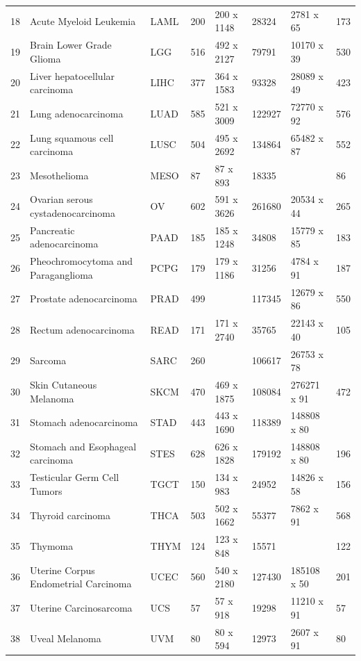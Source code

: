 \begin{widetable}[h]
\begin{tabular}{rlllllll}
  18 & Acute Myeloid Leukemia & LAML & 200 & 200 x 1148 & 28324 & 2781 x 65 & 173 \\ 
  19 & Brain Lower Grade Glioma & LGG & 516 & 492 x 2127 & 79791 & 10170 x 39 & 530 \\ 
  20 & Liver hepatocellular carcinoma & LIHC & 377 & 364 x 1583 & 93328 & 28089 x 49 & 423 \\ 
  21 & Lung adenocarcinoma & LUAD & 585 & 521 x 3009 & 122927 & 72770 x 92 & 576 \\ 
  22 & Lung squamous cell carcinoma & LUSC & 504 & 495 x 2692 & 134864 & 65482 x 87 & 552 \\ 
  23 & Mesothelioma & MESO & 87 & 87 x 893 & 18335 &  & 86 \\ 
  24 & Ovarian serous cystadenocarcinoma & OV & 602 & 591 x 3626 & 261680 & 20534 x 44 & 265 \\ 
  25 & Pancreatic adenocarcinoma & PAAD & 185 & 185 x 1248 & 34808 & 15779 x 85 & 183 \\ 
  26 & Pheochromocytoma and Paraganglioma & PCPG & 179 & 179 x 1186 & 31256 & 4784 x 91 & 187 \\ 
  27 & Prostate adenocarcinoma & PRAD & 499 &  & 117345 & 12679 x 86 & 550 \\ 
  28 & Rectum adenocarcinoma & READ & 171 & 171 x 2740 & 35765 & 22143 x 40 & 105 \\ 
  29 & Sarcoma & SARC & 260 &  & 106617 & 26753 x 78 &  \\ 
  30 & Skin Cutaneous Melanoma & SKCM & 470 & 469 x 1875 & 108084 & 276271 x 91 & 472 \\ 
  31 & Stomach adenocarcinoma & STAD & 443 & 443 x 1690 & 118389 & 148808 x 80 &  \\ 
  32 & Stomach and Esophageal carcinoma & STES & 628 & 626 x 1828 & 179192 & 148808 x 80 & 196 \\ 
  33 & Testicular Germ Cell Tumors & TGCT & 150 & 134 x 983 & 24952 & 14826 x 58 & 156 \\ 
  34 & Thyroid carcinoma & THCA & 503 & 502 x 1662 & 55377 & 7862 x 91 & 568 \\ 
  35 & Thymoma & THYM & 124 & 123 x 848 & 15571 &  & 122 \\ 
  36 & Uterine Corpus Endometrial Carcinoma & UCEC & 560 & 540 x 2180 & 127430 & 185108 x 50 & 201 \\ 
  37 & Uterine Carcinosarcoma & UCS & 57 & 57 x 918 & 19298 & 11210 x 91 & 57 \\ 
  38 & Uveal Melanoma & UVM & 80 & 80 x 594 & 12973 & 2607 x 91 & 80 \\
   \bottomrule
\end{tabular}
\end{widetable}

